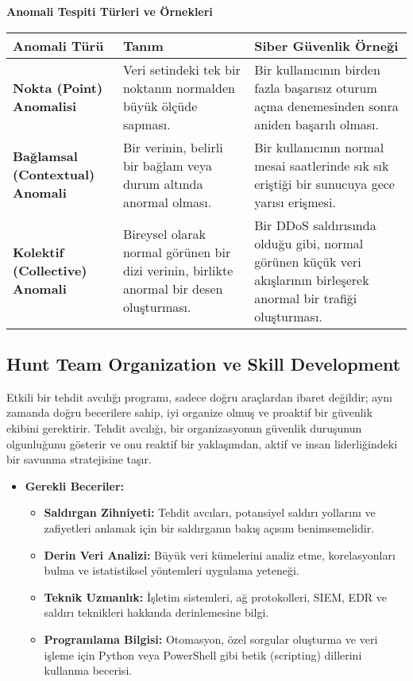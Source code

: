 \textbf{Anomali Tespiti Türleri ve Örnekleri}

\begin{tabularx}{\textwidth}{|l|X|X|}
\hline
\textbf{Anomali Türü} & \textbf{Tanım} & \textbf{Siber Güvenlik Örneği} \\
\hline
\textbf{Nokta (Point) Anomalisi} & Veri setindeki tek bir noktanın normalden büyük ölçüde sapması. & Bir kullanıcının birden fazla başarısız oturum açma denemesinden sonra aniden başarılı olması. \\
\hline
\textbf{Bağlamsal (Contextual) Anomali} & Bir verinin, belirli bir bağlam veya durum altında anormal olması. & Bir kullanıcının normal mesai saatlerinde sık sık eriştiği bir sunucuya gece yarısı erişmesi. \\
\hline
\textbf{Kolektif (Collective) Anomali} & Bireysel olarak normal görünen bir dizi verinin, birlikte anormal bir desen oluşturması. & Bir DDoS saldırısında olduğu gibi, normal görünen küçük veri akışlarının birleşerek anormal bir trafiği oluşturması. \\
\hline
\end{tabularx}

\subsection{Hunt Team Organization ve Skill Development}

Etkili bir tehdit avcılığı programı, sadece doğru araçlardan ibaret değildir; aynı zamanda doğru becerilere sahip, iyi organize olmuş ve proaktif bir güvenlik ekibini gerektirir. Tehdit avcılığı, bir organizasyonun güvenlik duruşunun olgunluğunu gösterir ve onu reaktif bir yaklaşımdan, aktif ve insan liderliğindeki bir savunma stratejisine taşır.

\begin{itemize}
    \item \textbf{Gerekli Beceriler:}
    \begin{itemize}
        \item \textbf{Saldırgan Zihniyeti:} Tehdit avcıları, potansiyel saldırı yollarını ve zafiyetleri anlamak için bir saldırganın bakış açısını benimsemelidir.
        \item \textbf{Derin Veri Analizi:} Büyük veri kümelerini analiz etme, korelasyonları bulma ve istatistiksel yöntemleri uygulama yeteneği.
        \item \textbf{Teknik Uzmanlık:} İşletim sistemleri, ağ protokolleri, SIEM, EDR ve saldırı teknikleri hakkında derinlemesine bilgi.
        \item \textbf{Programlama Bilgisi:} Otomasyon, özel sorgular oluşturma ve veri işleme için Python veya PowerShell gibi betik (scripting) dillerini kullanma becerisi.
    \end{itemize}
\end{itemize}

